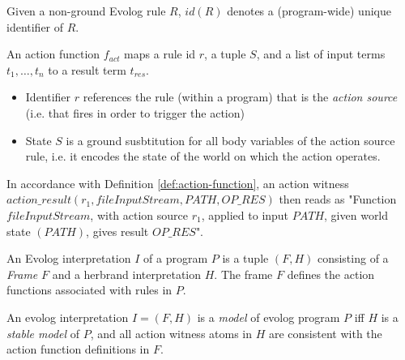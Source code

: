 \begin{definition}
\label{def:rule-id}
Given a non-ground Evolog rule $R$, $id(R)$ denotes a (program-wide) unique identifier of $R$.
\end{definition}

\begin{definition}
\label{def:action-function}
An action function $f_{act}$ maps a rule id $r$, a tuple $S$, and a list of input terms $t_1,\ldots, t_n$ to a result term $t_{res}$.
\begin{itemize}
	\item Identifier $r$ references the rule (within a program) that is the \emph{action source} (i.e. that fires in order to trigger the action)
	\item State $S$ is a ground susbtitution for all body variables of the action source rule, i.e. it encodes the state of the world on which the action operates.
\end{itemize}
\end{definition}
In accordance with Definition \ref{def:action-function}, an action witness $action\_result(r_1, fileInputStream, PATH, OP\_RES)$ then reads as "Function $fileInputStream$, with action source $r_1$, applied to input $PATH$, given world state $(PATH)$, gives result $OP\_RES$". 

\begin{definition}
\label{def:evolog-interpretation}
An Evolog interpretation $I$ of a program $P$ is a tuple $(F, H)$ consisting of a \emph{Frame} $F$ and a herbrand interpretation $H$. The frame $F$ defines the action functions associated with rules in $P$.
\end{definition}

\begin{definition}
An evolog interpretation $I = (F, H)$ is a \emph{model} of evolog program $P$ iff $H$ is a \emph{stable model} of $P$, and all action witness atoms in $H$ are consistent with the action function definitions in $F$.
\end{definition}